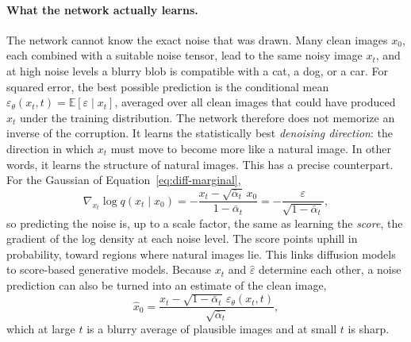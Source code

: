 \paragraph{What the network actually learns.}
The network cannot know the exact noise that was drawn. Many clean images
$x_0$, each combined with a suitable noise tensor, lead to the same noisy image
$x_t$, and at high noise levels a blurry blob is compatible with a cat, a dog,
or a car. For squared error, the best possible prediction is the conditional
mean $\varepsilon_\theta(x_t,t)=\mathbb E[\varepsilon\mid x_t]$, averaged
over all clean images that could have produced $x_t$ under the training
distribution. The network therefore does not memorize an inverse of the
corruption. It learns the statistically best \emph{denoising direction}: the
direction in which $x_t$ must move to become more like a natural image. In
other words, it learns the structure of natural images. This has a precise
counterpart. For the Gaussian of Equation~\ref{eq:diff-marginal},
\begin{equation}
  \nabla_{x_t}\log q(x_t\mid x_0)
  = -\frac{x_t-\sqrt{\bar\alpha_t}\,x_0}{1-\bar\alpha_t}
  = -\frac{\varepsilon}{\sqrt{1-\bar\alpha_t}},
  \label{eq:diff-score}
\end{equation}
\noindent
so predicting the noise is, up to a scale factor, the same as learning the
\emph{score}, the gradient of the log density at each noise level. The score
points uphill in probability, toward regions where natural images lie. This
links diffusion models to score-based generative models. Because $x_t$ and
$\hat\varepsilon$ determine each other, a noise prediction can also be turned
into an estimate of the clean image,
\begin{equation}
  \hat x_0 = \frac{x_t-\sqrt{1-\bar\alpha_t}\,\varepsilon_\theta(x_t,t)}
  {\sqrt{\bar\alpha_t}} ,
  \label{eq:diff-x0-hat}
\end{equation}
\noindent
which at large $t$ is a blurry average of plausible images and at small $t$
is sharp.

